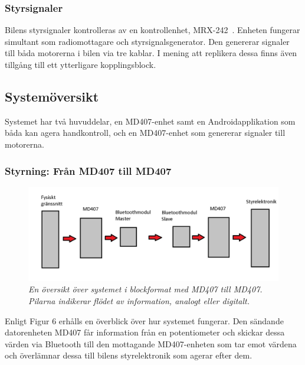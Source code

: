 \documentclass[a4paper]{article}
\begin{document}
\subsubsection{Styrsignaler}
Bilens styrsignaler kontrolleras av en kontrollenhet, MRX-242~\cite{projektDir}. Enheten fungerar simultant som radiomottagare och styrsignalsgenerator. Den genererar signaler till båda motorerna i bilen via tre kablar. I mening att replikera dessa finns även tillgång till ett ytterligare kopplingsblock.


\subsection{Systemöversikt}
Systemet har två huvuddelar, en MD407-enhet samt en Androidapplikation som båda kan agera handkontroll, och en MD407-enhet som genererar signaler till motorerna.

\subsubsection{Styrning: Från MD407 till MD407}
\begin{figure}[H]
\includegraphics[width=\textwidth]{systemoversikt.jpg}
\centering
\caption{\it En översikt över systemet i blockformat med MD407 till MD407. Pilarna indikerar flödet av information, analogt eller digitalt.}
\end{figure} 


Enligt Figur 6 erhålls en överblick över hur systemet fungerar. Den sändande datorenheten MD407 får information från en potentiometer och skickar dessa värden via Bluetooth till den mottagande MD407-enheten som tar emot värdena och överlämnar dessa till bilens styrelektronik som agerar efter dem.
\end{document}
